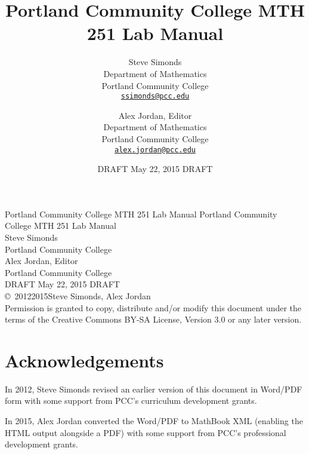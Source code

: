 \documentclass[12pt,]{book}
\title{Portland Community College MTH 251 Lab Manual}
\author{Steve Simonds\\
Department of Mathematics\\
Portland Community College\\
\href{mailto:ssimonds@pcc.edu}{\nolinkurl{ssimonds@pcc.edu}}
\and
Alex Jordan, Editor\\
Department of Mathematics\\
Portland Community College\\
\href{mailto:alex.jordan@pcc.edu}{\nolinkurl{alex.jordan@pcc.edu}}
}
\date{DRAFT May 22, 2015 DRAFT}
\theoremstyle{plain}
\theoremstyle{definition}
\numberwithin{equation}{section}
\begin{document}
\frontmatter
\thispagestyle{empty}
{\centering
\vspace*{0.28\textheight}
{\Huge Portland Community College MTH 251 Lab Manual}}
\clearpage
\thispagestyle{empty}
\null%
\clearpage
\thispagestyle{empty}
{\centering
\vspace*{0.14\textheight}
{\Huge Portland Community College MTH 251 Lab Manual}\\[2\baselineskip]
{\Large Steve Simonds}\\[0.5\baselineskip]
{\Large Portland Community College}\\[3\baselineskip]
{\Large Alex Jordan, Editor}\\[\baselineskip]
{\Large Portland Community College}\\[\baselineskip]
{\Large DRAFT May 22, 2015 DRAFT}\\
}
\clearpage
\thispagestyle{empty}
\noindent\copyright\ 2012\textendash{}2015\quad{}Steve Simonds, Alex Jordan\\[0.5\baselineskip]
Permission is granted to copy, distribute and/or modify this document under the terms of the Creative Commons BY-SA License, Version 3.0 or any later version.\par
{}
\null\clearpage
\chapter*{Acknowledgements}\label{acknowledgement-1}
In 2012, Steve Simonds revised an earlier version of this document in Word/PDF form with some support from PCC's curriculum development grants.%
\par
In 2015, Alex Jordan converted the Word/PDF to MathBook XML (enabling the HTML output alongside a PDF) with some support from PCC's professional development grants.%
\end{document}
